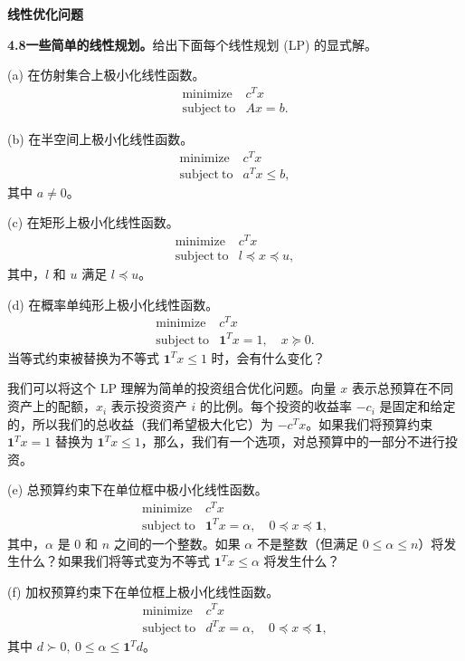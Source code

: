 \documentclass[UTF8,12pt,a4paper,fontset=fandol]{ctexart}
\begin{document}
\noindent\textbf{线性优化问题}

\noindent\textbf{4.8\quad 一些简单的线性规划。}\quad 给出下面每个线性规划 (LP) 的显式解。

(a) 在仿射集合上极小化线性函数。
\[
\begin{array}{ll}
\mathop{\mathrm{minimize}} & c^Tx\\
\mathrm{subject\ to} & Ax=b.
\end{array}
\]

(b) 在半空间上极小化线性函数。
\[
\begin{array}{ll}
\mathop{\mathrm{minimize}} & c^Tx\\
\mathrm{subject\ to} & a^Tx\leq b,
\end{array}
\]
其中 $a\neq0$。

(c) 在矩形上极小化线性函数。
\[
\begin{array}{ll}
\mathop{\mathrm{minimize}} & c^Tx\\
\mathrm{subject\ to} & l\preceq x\preceq u,
\end{array}
\]
其中，$l$ 和 $u$ 满足 $l\preceq u$。

(d) 在概率单纯形上极小化线性函数。
\[
\begin{array}{ll}
\mathop{\mathrm{minimize}} & c^Tx\\
\mathrm{subject\ to} & \mathbf{1}^Tx=1,\quad x\succeq0.
\end{array}
\]
当等式约束被替换为不等式 $\mathbf{1}^Tx\leq1$ 时，会有什么变化？

我们可以将这个 LP 理解为简单的投资组合优化问题。向量 $x$ 表示总预算在不同资产上的配额，$x_i$ 表示投资资产 $i$ 的比例。每个投资的收益率 $-c_i$ 是固定和给定的，所以我们的总收益（我们希望极大化它）为 $-c^Tx$。如果我们将预算约束 $\mathbf{1}^Tx=1$ 替换为 $\mathbf{1}^Tx\leq1$，那么，我们有一个选项，对总预算中的一部分不进行投资。

(e) 总预算约束下在单位框中极小化线性函数。
\[
\begin{array}{ll}
\mathop{\mathrm{minimize}} & c^Tx\\
\mathrm{subject\ to} & \mathbf{1}^Tx=\alpha,\quad 0\preceq x\preceq\mathbf{1},
\end{array}
\]
其中，$\alpha$ 是 $0$ 和 $n$ 之间的一个整数。如果 $\alpha$ 不是整数（但满足 $0\leq\alpha\leq n$）将发生什么？如果我们将等式变为不等式 $\mathbf{1}^Tx\leq\alpha$ 将发生什么？

(f) 加权预算约束下在单位框上极小化线性函数。
\[
\begin{array}{ll}
\mathop{\mathrm{minimize}} & c^Tx\\
\mathrm{subject\ to} & d^Tx=\alpha,\quad 0\preceq x\preceq\mathbf{1},
\end{array}
\]
其中 $d\succ0,\ 0\leq\alpha\leq\mathbf{1}^Td$。
\end{document}
